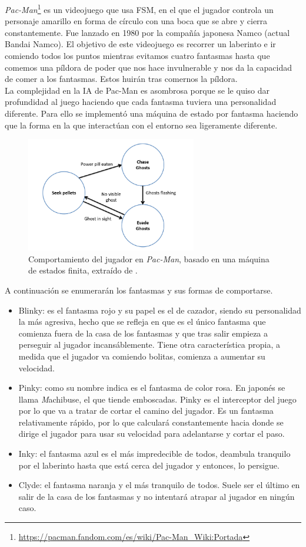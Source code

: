 \textit{Pac-Man}\footnote{\url{https://pacman.fandom.com/es/wiki/Pac-Man_Wiki:Portada}} es un videojuego que usa FSM, en el que el jugador controla un personaje amarillo en forma de círculo con una boca que se abre y cierra constantemente. Fue lanzado en 1980 por la compañía japonesa Namco (actual Bandai Namco). El objetivo de este videojuego es recorrer un laberinto e ir comiendo todos los puntos mientras evitamos cuatro fantasmas hasta que comemos una píldora de poder que nos hace invulnerable y nos da la capacidad de comer a los fantasmas. Estos huirán tras comernos la píldora.\\
La complejidad en la IA de Pac-Man es asombrosa porque se le quiso dar profundidad al juego haciendo que cada fantasma tuviera una personalidad diferente. Para ello se implementó una máquina de estado por fantasma haciendo que la forma en la que interactúan con el entorno sea ligeramente diferente.
\begin{figure}[t]
	\centering
	\includegraphics[height=5cm]{Imagenes/FMS_MsPac-man.png}
	\caption{Comportamiento del jugador en \textit{Pac-Man}, basado en una máquina de estados finita, extraído de \cite{YannakakisTogelius2018}.}
	\label{fig:Comportamiento jugador Pac-Man}
\end{figure}
A continuación se enumerarán los fantasmas y sus formas de comportarse.
\begin{itemize}
	 \item Blinky: es el fantasma rojo y su papel es el de cazador, siendo su personalidad la más agresiva, hecho que se refleja en que es el único fantasma que comienza fuera de la casa de los fantasmas y que tras salir empieza a perseguir al jugador incansáblemente. Tiene otra característica propia, a medida que el jugador va comiendo bolitas, comienza a aumentar su velocidad.
	 \item Pinky: como su nombre indica es el fantasma de color rosa. En japonés se llama \textit Machibuse, el que tiende emboscadas. Pinky es el interceptor del juego por lo que va a tratar de cortar el camino del jugador. Es un fantasma relativamente rápido, por lo que calculará constantemente hacia donde se dirige el jugador para usar su velocidad para adelantarse y cortar el paso.
	 \item Inky: el fantasma azul es el más impredecible de todos, deambula tranquilo por el laberinto hasta que está cerca del jugador y entonces, lo persigue.
	 \item Clyde: el fantasma naranja y el más tranquilo de todos. Suele ser el último en salir de la casa de los fantasmas y no intentará atrapar al jugador en ningún caso. 
\end{itemize}
